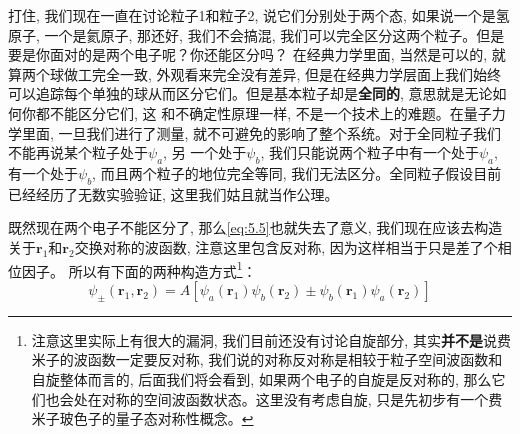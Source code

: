 \documentclass[a4paper,zihao=-4,linespread=1]{ctexrep}
\begin{document}
    打住, 我们现在一直在讨论粒子1和粒子2, 说它们分别处于两个态, 如果说一个是氢原子, 一个是氦原子, 那还好, 我们不会搞混, 我们可以完全区分这两个粒子。但是要是你面对的是两个电子呢？你还能区分吗？
    在经典力学里面, 当然是可以的, 就算两个球做工完全一致, 外观看来完全没有差异, 但是在经典力学层面上我们始终可以追踪每个单独的球从而区分它们。但是基本粒子却是\textbf{全同的}, 意思就是无论如何你都不能区分它们, 这
    和不确定性原理一样, 不是一个技术上的难题。在量子力学里面, 一旦我们进行了测量, 就不可避免的影响了整个系统。对于全同粒子我们不能再说某个粒子处于$\psi_a$, 另
    一个处于$\psi_b$, 我们只能说两个粒子中有一个处于$\psi_a$, 有一个处于$\psi_b$, 而且两个粒子的地位完全等同, 我们无法区分。全同粒子假设目前已经经历了无数实验验证, 这里我们姑且就当作公理。

    既然现在两个电子不能区分了, 那么\ref{eq:5.5}也就失去了意义, 我们现在应该去构造关于$\mathbf{r}_1$和$\mathbf{r}_2$交换对称的波函数, 注意这里包含反对称, 因为这样相当于只是差了个相位因子。
    所以有下面的两种构造方式\footnote{注意这里实际上有很大的漏洞, 我们目前还没有讨论自旋部分, 其实\textbf{并不是}说费米子的波函数一定要反对称, 我们说的对称反对称是相较于粒子空间波函数和自旋整体而言的, 后面我们将会看到, 如果两个电子的自旋是反对称的, 那么它们也会处在对称的空间波函数状态。这里没有考虑自旋, 只是先初步有一个费米子玻色子的量子态对称性概念。}：
    \begin{equation}
        \label{eq:5.6}
        \psi_\pm(\mathbf{r}_1,\mathbf{r}_2)=A\left[\psi_a(\mathbf{r}_1)\psi_b(\mathbf{r}_2)\pm\psi_b(\mathbf{r}_1)\psi_a(\mathbf{r}_2)\right]
    \end{equation}
    
\end{document}

